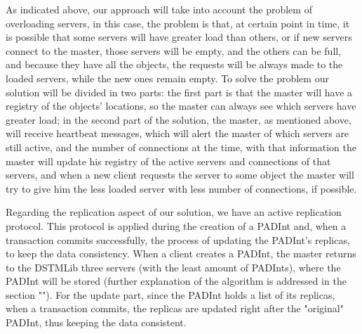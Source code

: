 \documentclass[times, 10pt,twocolumn]{article}
\begin{document}
As indicated above, our approach will take into account the problem of overloading servers, in this case, the problem is that, at certain point in time, it is possible that some servers will have greater load than others, or if new servers connect to the master, those servers will be empty, and the others can be full, and because they have all the objects, the requests will be always made to the loaded servers, while the new ones remain empty. To solve the problem our solution will be divided in two parts: the first part is that the master will have a registry of the objects' locations, so the master can always see which servers have greater load; in the second part of the solution, the master, as mentioned above, will receive heartbeat messages, which will alert the master of which servers are still active, and the number of connections at the time, with that information the master will update his registry of the active servers and connections of that servers, and when a new client requests the server to some object the master will try to give him the less loaded server with less number of connections, if possible. 

Regarding the replication aspect of our solution, we have an active replication protocol. This protocol is applied during the creation of a PADInt and, when a transaction commits successfully, the process of updating the PADInt's replicas, to keep the data consistency.
When a client creates a PADInt, the master returns to the DSTMLib three servers (with the least amount of PADInts), where the PADInt will be stored (further explanation of the algorithm is addressed in the section ""). For the update part, since the PADInt holds a list of its replicas, when a transaction commits, the replicas are updated right after the "original" PADInt, thus keeping the data consistent.
\end{document}
